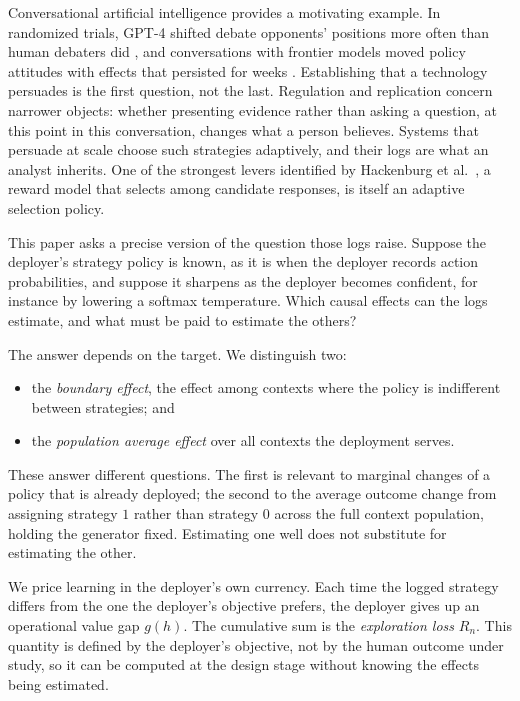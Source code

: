 \documentclass[12pt]{article}
\theoremstyle{definition}
\theoremstyle{remark}
\begin{document}
Conversational artificial intelligence provides a motivating example. In randomized trials, GPT-4
shifted debate opponents' positions more often than human debaters did
\cite{salvi2025conversational}, and conversations with frontier models moved
policy attitudes with effects that persisted for weeks
\cite{hackenburg2025levers}. Establishing that a technology persuades is the
first question, not the last. Regulation and replication concern narrower
objects: whether presenting evidence rather than asking a question, at this
point in this conversation, changes what a person believes. Systems that
persuade at scale choose such strategies adaptively, and their logs are what
an analyst inherits. One of the strongest levers identified by
Hackenburg et al.~\cite{hackenburg2025levers}, a reward model that selects among candidate
responses, is itself an adaptive selection policy.

This paper asks a precise version of the question those logs raise. Suppose
the deployer's strategy policy is known, as it is when the deployer records
action probabilities, and suppose it sharpens as the deployer becomes
confident, for instance by lowering a softmax temperature. Which causal
effects can the logs estimate, and what must be paid to estimate the others?

The answer depends on the target. We distinguish two:
\begin{itemize}[leftmargin=1.5em,itemsep=2pt]
\item the \emph{boundary effect}, the effect among contexts where the policy is
indifferent between strategies; and
\item the \emph{population average effect} over all contexts the deployment
serves.
\end{itemize}
These answer different questions. The first is relevant to marginal changes
of a policy that is already deployed; the second to the average outcome change from assigning strategy $1$
rather than strategy $0$ across the full context population, holding the
generator fixed. Estimating one well does not substitute for estimating the
other.

We price learning in the deployer's own currency. Each time the logged
strategy differs from the one the deployer's objective prefers, the deployer
gives up an operational value gap $g(h)$. The cumulative sum is the
\emph{exploration loss} $R_n$. This quantity is defined by the deployer's
objective, not by the human outcome under study, so it can be computed at the
design stage without knowing the effects being estimated.
\end{document}
